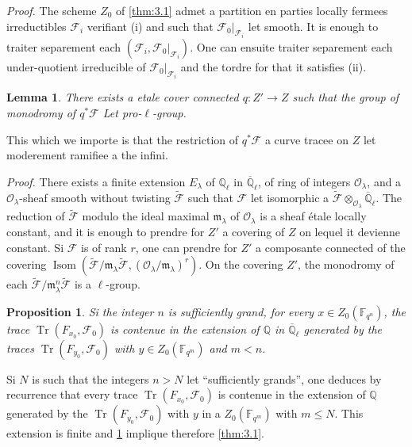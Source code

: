 \documentclass[11pt,a4paper]{article}
\theoremstyle{plain}
\newtheorem{lemma}[theorem]{Lemma}
\newtheorem{proposition}[theorem]{Proposition}
\theoremstyle{definition}
\DeclareMathOperator{\tr}{Tr}
\DeclareMathOperator{\Isom}{Isom}
\begin{document}
\noindent\textit{Proof.} The scheme $Z_0$ of \ref{thm:3.1} admet a partition en parties locally fermees irreductibles $\mathcal{F}_i$ verifiant (i) and such that $\mathcal{F}_0|_{\mathcal{F}_i}$ let smooth. It is enough to traiter separement each $(\mathcal{F}_i, \mathcal{F}_0|_{\mathcal{F}_i})$. One can ensuite traiter separement each under-quotient irreducible of $\mathcal{F}_0|_{\mathcal{F}_i}$ and the tordre for that it satisfies (ii).

\begin{lemma}\label{lem:3.3}
There exists a etale cover connected $q: Z' \to Z$ such that the group of monodromy of $q^*\mathcal{F}$ Let pro-$\ell$-group.
\end{lemma}

This which we importe is that the restriction of $q^*\mathcal{F}$ a curve tracee on $Z$ let moderement ramifiee a the infini.

\noindent\textit{Proof.} There exists a finite extension $E_\lambda$ of $\mathbb{Q}_\ell$ in $\overline{\mathbb{Q}}_\ell$, of ring of integers $\mathcal{O}_\lambda$, and a $\mathcal{O}_\lambda$-sheaf smooth without twisting $\tilde{\mathcal{F}}$ such that $\mathcal{F}$ let isomorphic a $\tilde{\mathcal{F}} \otimes_{\mathcal{O}_\lambda} \overline{\mathbb{Q}}_\ell$. The reduction of $\tilde{\mathcal{F}}$ modulo the ideal maximal $\mathfrak{m}_\lambda$ of $\mathcal{O}_\lambda$ is a sheaf étale locally constant, and it is enough to prendre for $Z'$ a covering of $Z$ on lequel it devienne constant. Si $\mathcal{F}$ is of rank $r$, one can prendre for $Z'$ a composante connected of the covering $\Isom(\tilde{\mathcal{F}}/\mathfrak{m}_\lambda\tilde{\mathcal{F}}, (\mathcal{O}_\lambda/\mathfrak{m}_\lambda)^r)$. On the covering $Z'$, the monodromy of each $\tilde{\mathcal{F}}/\mathfrak{m}_\lambda^n\tilde{\mathcal{F}}$ is a $\ell$-group.

\begin{proposition}\label{prop:3.4}
Si the integer $n$ is sufficiently grand, for every $x \in Z_0(\mathbb{F}_{q^n})$, the trace $\tr(F_{x_0}, \mathcal{F}_0)$ is contenue in the extension of $\mathbb{Q}$ in $\overline{\mathbb{Q}}_\ell$ generated by the traces $\tr(F_{y_0}, \mathcal{F}_0)$ with $y \in Z_0(\mathbb{F}_{q^m})$ and $m < n$.
\end{proposition}

Si $N$ is such that the integers $n > N$ let ``sufficiently grands'', one deduces by recurrence that every trace $\tr(F_{x_0}, \mathcal{F}_0)$ is contenue in the extension of $\mathbb{Q}$ generated by the $\tr(F_{y_0}, \mathcal{F}_0)$ with $y$ in a $Z_0(\mathbb{F}_{q^m})$ with $m \leq N$. This extension is finite and \ref{prop:3.4} implique therefore \ref{thm:3.1}.
\end{document}
